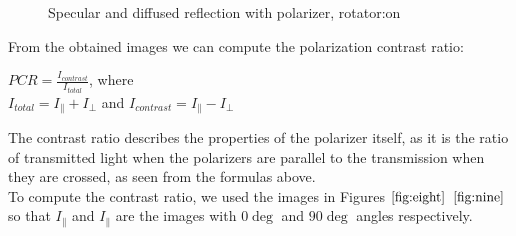 \documentclass[english]{article}
\begin{document}
\begin{figure}[H]
	\centering
	\caption{Specular and diffused reflection with polarizer, rotator:on}
	\label{fig:nine}
\end{figure}
From the obtained images we can compute the polarization contrast ratio:\\
\begin{center}
$PCR = \frac{I_{contrast}}{I_{total}}$,
where\\

$I_{total} = I_{\parallel} + I_{\perp}$ 
and 
$I_{contrast} = I_{\parallel} - I_{\perp}$
\end{center}
The contrast ratio describes the properties of the polarizer itself, as it is the ratio of transmitted light when the polarizers are parallel to the transmission when they are crossed, as seen from the formulas above.\\
To compute the contrast ratio, we used the images in Figures $\ref{fig:eight}$ $\ref{fig:nine}$ so that $I_{\parallel}$ and $I_{\parallel}$ are the images with $0\deg$ and $90\deg$ angles respectively.\\
\end{document}
